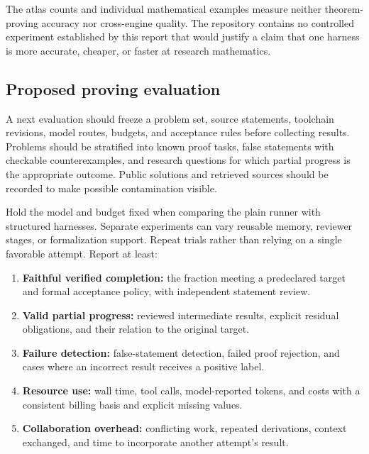 \documentclass[10pt,letterpaper]{article}
\begin{document}
The atlas counts and individual mathematical examples measure neither theorem-proving accuracy nor cross-engine quality. The repository contains no controlled experiment established by this report that would justify a claim that one harness is more accurate, cheaper, or faster at research mathematics.

\subsection{Proposed proving evaluation}

A next evaluation should freeze a problem set, source statements, toolchain revisions, model routes, budgets, and acceptance rules before collecting results. Problems should be stratified into known proof tasks, false statements with checkable counterexamples, and research questions for which partial progress is the appropriate outcome. Public solutions and retrieved sources should be recorded to make possible contamination visible.


Hold the model and budget fixed when comparing the plain runner with structured harnesses. Separate experiments can vary reusable memory, reviewer stages, or formalization support. Repeat trials rather than relying on a single favorable attempt. Report at least:

\begin{enumerate}

\item \textbf{Faithful verified completion:} the fraction meeting a predeclared target and formal acceptance policy, with independent statement review.

\item \textbf{Valid partial progress:} reviewed intermediate results, explicit residual obligations, and their relation to the original target.

\item \textbf{Failure detection:} false-statement detection, failed proof rejection, and cases where an incorrect result receives a positive label.

\item \textbf{Resource use:} wall time, tool calls, model-reported tokens, and costs with a consistent billing basis and explicit missing values.

\item \textbf{Collaboration overhead:} conflicting work, repeated derivations, context exchanged, and time to incorporate another attempt's result.

\end{enumerate}
\end{document}

